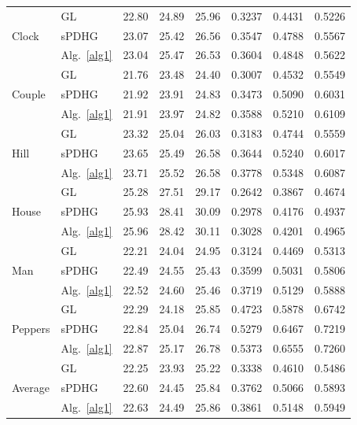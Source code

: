 \documentclass{article}
\theoremstyle{definition}
\begin{document}
\begin{table}[htbp]
\begin{tabular}{llcccccc}
\midrule
\multirow{3}{*}{Clock}
& GL & 22.80 & 24.89 & 25.96 & 0.3237 & 0.4431 & 0.5226 \\
& sPDHG & 23.07 & 25.42 & 26.56 & 0.3547 & 0.4788 & 0.5567 \\
& Alg.~\ref{alg1} & 23.04 & 25.47 & 26.53 & 0.3604 & 0.4848 & 0.5622 \\
\midrule
\multirow{3}{*}{Couple}
& GL & 21.76 & 23.48 & 24.40 & 0.3007 & 0.4532 & 0.5549 \\
& sPDHG & 21.92 & 23.91 & 24.83 & 0.3473 & 0.5090 & 0.6031 \\
& Alg.~\ref{alg1} & 21.91 & 23.97 & 24.82 & 0.3588 & 0.5210 & 0.6109 \\
\midrule
\multirow{3}{*}{Hill}
& GL & 23.32 & 25.04 & 26.03 & 0.3183 & 0.4744 & 0.5559 \\
& sPDHG & 23.65 & 25.49 & 26.58 & 0.3644 & 0.5240 & 0.6017 \\
& Alg.~\ref{alg1} & 23.71 & 25.52 & 26.58 & 0.3778 & 0.5348 & 0.6087 \\
\midrule
\multirow{3}{*}{House}
& GL & 25.28 & 27.51 & 29.17 & 0.2642 & 0.3867 & 0.4674 \\
& sPDHG & 25.93 & 28.41 & 30.09 & 0.2978 & 0.4176 & 0.4937 \\
& Alg.~\ref{alg1} & 25.96 & 28.42 & 30.11 & 0.3028 & 0.4201 & 0.4965 \\
\midrule
\multirow{3}{*}{Man}
& GL & 22.21 & 24.04 & 24.95 & 0.3124 & 0.4469 & 0.5313 \\
& sPDHG & 22.49 & 24.55 & 25.43 & 0.3599 & 0.5031 & 0.5806 \\
& Alg.~\ref{alg1} & 22.52 & 24.60 & 25.46 & 0.3719 & 0.5129 & 0.5888 \\
\midrule
\multirow{3}{*}{Peppers}
& GL & 22.29 & 24.18 & 25.85 & 0.4723 & 0.5878 & 0.6742 \\
& sPDHG & 22.84 & 25.04 & 26.74 & 0.5279 & 0.6467 & 0.7219 \\
& Alg.~\ref{alg1} & 22.87 & 25.17 & 26.78 & 0.5373 & 0.6555 & 0.7260 \\
\midrule
\multirow{3}{*}{Average}
& GL & 22.25 & 23.93 & 25.22 & 0.3338 & 0.4610 & 0.5486 \\
& sPDHG & 22.60 & 24.45 & 25.84 & 0.3762 & 0.5066 & 0.5893 \\
& Alg.~\ref{alg1} & 22.63 & 24.49 & 25.86 & 0.3861 & 0.5148 & 0.5949 \\
\bottomrule
\end{tabular}
\end{table}
\end{document}
